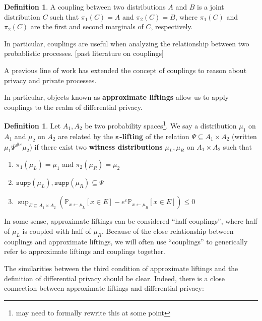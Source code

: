 \documentclass[12pt]{article}
\newcommand{\PP}{\mathbb{P}}
\newcommand{\supp}{\texttt{supp}}
\theoremstyle{definition}
\newtheorem{defn}[thm]{Definition}
\begin{document}
\begin{defn}
    A coupling between two distributions $A$ and $B$ is a joint distribution $C$ such that $\pi_1(C)=A$ and $\pi_2(C)=B$, where $\pi_1(C)$ and $\pi_2(C)$ are the first and second marginals of $C$, respectively. 
\end{defn}

In particular, couplings are useful when analyzing the relationship between two probablistic processes. [past literature on couplings]

A previous line of work has extended the concept of couplings to reason about privacy and private processes. 

In particular, objects known as \textbf{approximate liftings} \cite{BartheOlmedo2013,bartheKopfOlmedo2012ProbabilisticRelationalReasoningforDifferentialPriv,HsuThesis2017,BartheEtAl2016} allow us to apply couplings to the realm of differential privacy. 

\begin{defn}
    Let $A_1, A_2$ be two probability spaces\footnote{may need to formally rewrite this at some point}. We say a distribution $\mu_1$ on $A_1$ and $\mu_2$ on $A_2$ are related by the $\mathbf{\varepsilon}$\textbf{-lifting} of the relation $\Psi\subseteq A_1\times A_2$ (written $\mu_1\Psi^{\#\varepsilon}\mu_2$) if there exist two \textbf{witness distributions} $\mu_L, \mu_R$ on $A_1\times A_2$ such that\begin{enumerate}
        \item $\pi_1(\mu_L) = \mu_1$ and $\pi_2(\mu_R) = \mu_2$
        \item $\supp(\mu_L), \supp(\mu_R)\subseteq \Psi$
        \item $\sup_{E\subseteq A_1\times A_2}(\PP_{x\gets \mu_L}[x\in E]- e^\varepsilon \PP_{x\gets \mu_R}[x\in E])\leq 0$
    \end{enumerate}
\end{defn}

In some sense, approximate liftings can be considered ``half-couplings'', where half of $\mu_L$ is coupled with half of $\mu_R$. Because of the close relationship between couplings and approximate liftings, we will often use ``couplings'' to generically refer to approximate liftings and couplings together.

The similarities between the third condition of approximate liftings and the definition of differential privacy should be clear. Indeed, there is a close connection between approximate liftings and differential privacy:
\end{document}
